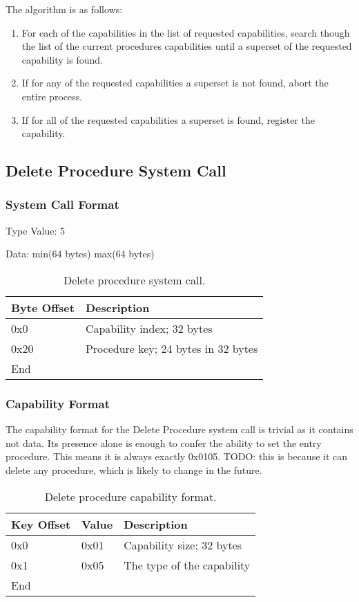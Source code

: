 \documentclass[english,a4paper]{article}
\let\oldparagraph\subsubsection
\renewcommand{\subsubsection}[1]{\oldparagraph{#1}\mbox{}}
\begin{document}
The algorithm is as follows:

\begin{enumerate}
  \item For each of the capabilities in the list of requested capabilities,
  search though the list of the current procedures capabilities until a superset
  of the requested capability is found.
  \item If for any of the requested capabilities a superset is not found, abort
  the entire process.
  \item If for all of the requested capabilities a superset is found, register
  the capability.
\end{enumerate}

\subsection{Delete Procedure System Call}

\subsubsection{System Call Format}
Type Value: 5

Data: min(64 bytes) max(64 bytes)

\begin{table}[H]
  \caption{Delete procedure system call.}
  \centering{}%
  \begin{tabular}{l|p{}}
    \hline
    Byte Offset & Description\tabularnewline
    \hline
    \hline
    0x0 & Capability index; 32 bytes \tabularnewline
    0x20 & Procedure key; 24 bytes in 32 bytes \tabularnewline
    \hline
    End &  \tabularnewline
    \hline
  \end{tabular}
\end{table}

\subsubsection{Capability Format}
The capability format for the Delete Procedure system call is trivial as it
contains not data. Its presence alone is enough to confer the ability to set the
entry procedure. This means it is always exactly 0x0105. TODO: this is because
it can delete any procedure, which is likely to change in the future.

\begin{table}[H]
  \caption{Delete procedure capability format.}
  \centering{}%
  \begin{tabular}{l|l|p{}}
    \hline
    Key Offset & Value & Description\tabularnewline
    \hline
    \hline
    0x0 & 0x01 & Capability size; 32 bytes \tabularnewline
    0x1 & 0x05 & The type of the capability \tabularnewline
    \hline
    End &  \tabularnewline
    \hline
  \end{tabular}
\end{table}
\end{document}

